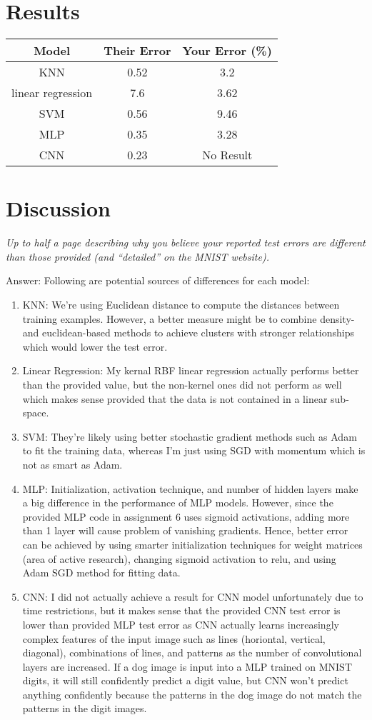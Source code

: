 \documentclass{article}
\def\ans#1{\par\gre{Answer: #1}}{}
\def\gre#1{{\color{gre}#1}}
\def\enum#1{\begin{enumerate}#1\end{enumerate}}
\begin{document}
\section{Results}
\begin{center}
 \begin{tabular}{|c | c | c|} 
 \hline
 Model & Their Error & Your Error (\%) \\ [0.5ex]
 \hline\hline
 KNN & 0.52 & 3.2 \\
 linear regression & 7.6 & 3.62 \\
 SVM & 0.56 & 9.46 \\
 MLP & 0.35 & 3.28\\
 CNN & 0.23 & No Result\\ 
 \hline
\end{tabular}
\end{center}

\section{Discussion}
\emph{Up to half a page describing why you believe your reported test errors are different than those provided (and ``detailed'' on the MNIST website).}

\ans{
Following are potential sources of differences for each model:
\enum{
\item KNN: We're using Euclidean distance to compute the distances between training examples. However, a better measure might be to combine density- and euclidean-based methods to achieve clusters with stronger relationships which would lower the test error.
\item Linear Regression: My kernal RBF linear regression actually performs better than the provided value, but the non-kernel ones did not perform as well which makes sense provided that the data is not contained in a linear sub-space.
\item SVM: They're likely using better stochastic gradient methods such as Adam to fit the training data, whereas I'm just using SGD with momentum which is not as smart as Adam.
\item MLP: Initialization, activation technique, and number of hidden layers make a big difference in the performance of MLP models. However, since the provided MLP code in assignment 6 uses sigmoid activations, adding more than 1 layer will cause problem of vanishing gradients. Hence, better error can be achieved by using smarter initialization techniques for weight matrices (area of active research), changing sigmoid activation to relu, and using Adam SGD method for fitting data. 
\item CNN: I did not actually achieve a result for CNN model unfortunately due to time restrictions, but it makes sense that the provided CNN test error is lower than provided MLP test error as CNN actually learns increasingly complex features of the input image such as lines (horiontal, vertical, diagonal), combinations of lines, and patterns as the number of convolutional layers are increased. If a dog image is input into a MLP trained on MNIST digits, it will still confidently predict a digit value, but CNN won't predict anything confidently because the patterns in the dog image do not match the patterns in the digit images. 
}
}
\end{document}
